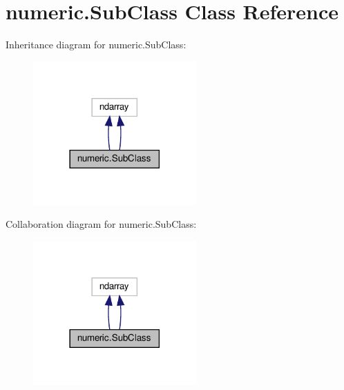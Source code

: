 \hypertarget{classnumeric_1_1SubClass}{}\section{numeric.\+Sub\+Class Class Reference}
\label{classnumeric_1_1SubClass}


Inheritance diagram for numeric.\+Sub\+Class\+:
\nopagebreak
\begin{figure}[H]
\begin{center}
\leavevmode
\includegraphics[width=177pt]{classnumeric_1_1SubClass__inherit__graph}
\end{center}
\end{figure}


Collaboration diagram for numeric.\+Sub\+Class\+:
\nopagebreak
\begin{figure}[H]
\begin{center}
\leavevmode
\includegraphics[width=177pt]{classnumeric_1_1SubClass__coll__graph}
\end{center}
\end{figure}
